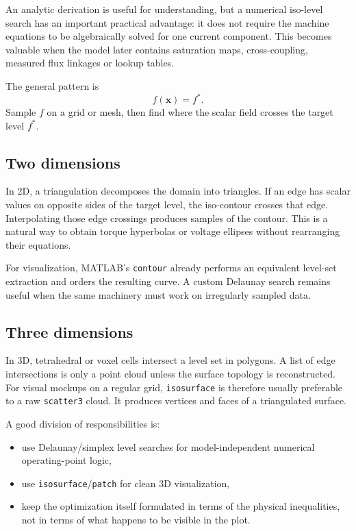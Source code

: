 \documentclass[11pt,a4paper]{article}
\newcommand{\vct}[1]{\bm{#1}}
\begin{document}
An analytic derivation is useful for understanding, but a numerical iso-level search has an important practical advantage: it does not require the machine equations to be algebraically solved for one current component. This becomes valuable when the model later contains saturation maps, cross-coupling, measured flux linkages or lookup tables.

The general pattern is
\begin{equation}
  f(\vct x)=f^*.
\end{equation}
Sample $f$ on a grid or mesh, then find where the scalar field crosses the target level $f^*$.

\subsection{Two dimensions}

In 2D, a triangulation decomposes the domain into triangles. If an edge has scalar values on opposite sides of the target level, the iso-contour crosses that edge. Interpolating those edge crossings produces samples of the contour. This is a natural way to obtain torque hyperbolas or voltage ellipses without rearranging their equations.

For visualization, MATLAB's \texttt{contour} already performs an equivalent level-set extraction and orders the resulting curve. A custom Delaunay search remains useful when the same machinery must work on irregularly sampled data.

\subsection{Three dimensions}

In 3D, tetrahedral or voxel cells intersect a level set in polygons. A list of edge intersections is only a point cloud unless the surface topology is reconstructed. For visual mockups on a regular grid, \texttt{isosurface} is therefore usually preferable to a raw \texttt{scatter3} cloud. It produces vertices and faces of a triangulated surface.

A good division of responsibilities is:

\begin{itemize}
  \item use Delaunay/simplex level searches for model-independent numerical operating-point logic,
  \item use \texttt{isosurface}/\texttt{patch} for clean 3D visualization,
  \item keep the optimization itself formulated in terms of the physical inequalities, not in terms of what happens to be visible in the plot.
\end{itemize}
\end{document}
